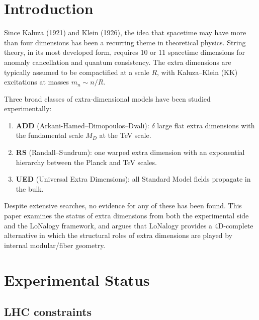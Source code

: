 \documentclass[12pt]{article}
\theoremstyle{plain}
\theoremstyle{definition}
\numberwithin{equation}{section}
\begin{document}
\setcounter{page}{1}
\tableofcontents
\newpage


\section{Introduction}\label{sec:intro}

Since Kaluza (1921) and Klein (1926), the idea that spacetime may
have more than four dimensions has been a recurring theme in
theoretical physics.  String theory, in its most developed form,
requires 10 or 11 spacetime dimensions for anomaly cancellation and
quantum consistency.  The extra dimensions are typically assumed to
be compactified at a scale $R$, with Kaluza--Klein (KK) excitations
at masses $m_n\sim n/R$.

Three broad classes of extra-dimensional models have been studied
experimentally:
\begin{enumerate}[label=(\roman*)]
\item \textbf{ADD} (Arkani-Hamed--Dimopoulos--Dvali): $\delta$
large flat extra dimensions with the fundamental scale $M_D$ at
the TeV scale.
\item \textbf{RS} (Randall--Sundrum): one warped extra dimension
with an exponential hierarchy between the Planck and TeV scales.
\item \textbf{UED} (Universal Extra Dimensions): all Standard Model
fields propagate in the bulk.
\end{enumerate}

Despite extensive searches, no evidence for any of these has been
found.  This paper examines the status of extra dimensions from
both the experimental side and the LoNalogy framework, and argues
that LoNalogy provides a 4D-complete alternative in which the
structural roles of extra dimensions are played by internal
modular/fiber geometry.


\section{Experimental Status}\label{sec:experiment}

\subsection{LHC constraints}
\end{document}
